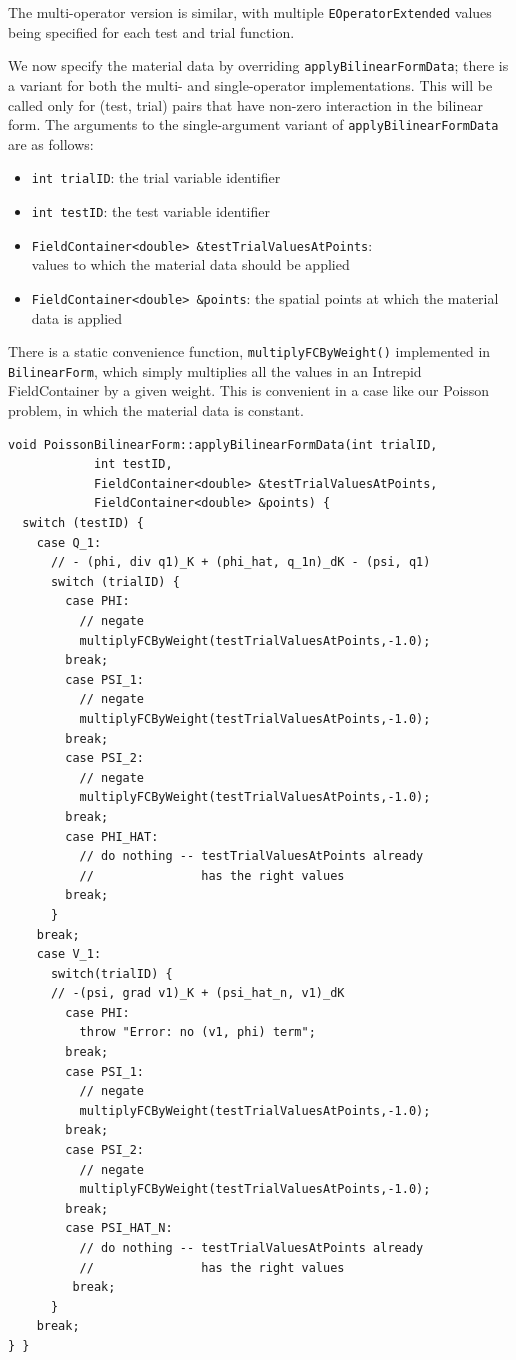 The multi-operator version is similar, with multiple \verb=EOperatorExtended= values being specified for each test and trial function.

We now specify the material data by overriding \verb=applyBilinearFormData=; there is a variant for both the multi- and single-operator implementations.  This will be called only for (test, trial) pairs that have non-zero interaction in the bilinear form.  The arguments to the single-argument variant of \verb=applyBilinearFormData= are as follows:
\begin{itemize}
\item \verb=int trialID=: the trial variable identifier
\item \verb=int testID=: the test variable identifier
\item \verb=FieldContainer<double> &testTrialValuesAtPoints=:\\
      values to which the material data should be applied 
\item \verb=FieldContainer<double> &points=: the spatial points at which the material data is applied
\end{itemize}

There is a static convenience function, \verb=multiplyFCByWeight()= implemented in \verb=BilinearForm=, which simply multiplies all the values in an Intrepid FieldContainer by a given weight.  This is convenient in a case like our Poisson problem, in which the material data is constant.
\begin{lstlisting}
void PoissonBilinearForm::applyBilinearFormData(int trialID,
            int testID, 
            FieldContainer<double> &testTrialValuesAtPoints, 
            FieldContainer<double> &points) {
  switch (testID) {
    case Q_1:
      // - (phi, div q1)_K + (phi_hat, q_1n)_dK - (psi, q1)
      switch (trialID) {
        case PHI:
          // negate
          multiplyFCByWeight(testTrialValuesAtPoints,-1.0);
        break;
        case PSI_1:
          // negate
          multiplyFCByWeight(testTrialValuesAtPoints,-1.0);
        break;
        case PSI_2:
          // negate
          multiplyFCByWeight(testTrialValuesAtPoints,-1.0);         
        break;
        case PHI_HAT:
          // do nothing -- testTrialValuesAtPoints already
          //               has the right values 
        break;
      }
    break;
    case V_1:
      switch(trialID) {
      // -(psi, grad v1)_K + (psi_hat_n, v1)_dK
        case PHI:
          throw "Error: no (v1, phi) term";
        break;
        case PSI_1:
          // negate
          multiplyFCByWeight(testTrialValuesAtPoints,-1.0);
        break;
        case PSI_2:
          // negate
          multiplyFCByWeight(testTrialValuesAtPoints,-1.0);
        break;
        case PSI_HAT_N:
          // do nothing -- testTrialValuesAtPoints already
          //               has the right values
         break;
      }
    break;
} }
\end{lstlisting}


